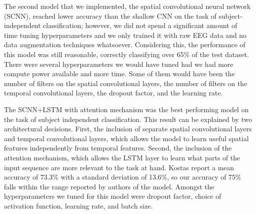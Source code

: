 \documentclass[10pt,twocolumn,letterpaper]{article}
\begin{document}
The second model that we implemented, the spatial convolutional neural network
(SCNN), reached lower accuracy than the shallow CNN on the task of
subject-independent classification; however, we did not spend a significant
amount of time tuning hyperparameters and we only trained it with raw EEG data
and no data augmentation techniques whatsoever.
Considering this, the performance of this model was still reasonable, correctly
classifying over 65\% of the test dataset.
There were several hyperparameters we would have tuned had we had more compute
power available and more time. Some of them would have been the number of
filters on the spatial convolutional layers, the number of filters on the
temporal convolutional layers, the dropout factor, and the learning rate.

The SCNN+LSTM with attention mechanism was the best performing model on the task
of subject independent classification. 
This result can be explained by two architectural decisions. 
First, the inclusion of separate spatial convolutional layers and temporal
convolutional layers, which allows the model to learn useful spatial features
independently from temporal features. 
Second, the inclusion of the attention mechanism, which allows the LSTM layer to
learn what parts of the input sequence are more relevant to the task at hand. 
Kostas \etal \cite{kostas2019machine} report a mean accuracy of 73.3\% with a
standard deviation of 13.6\%, so our accuracy of 75\% falls within the range
reported by authors of the model.
Amongst the hyperparameters we tuned for this model were dropout factor, choice
of activation function, learning rate, and batch size.

{\small


}
\end{document}
